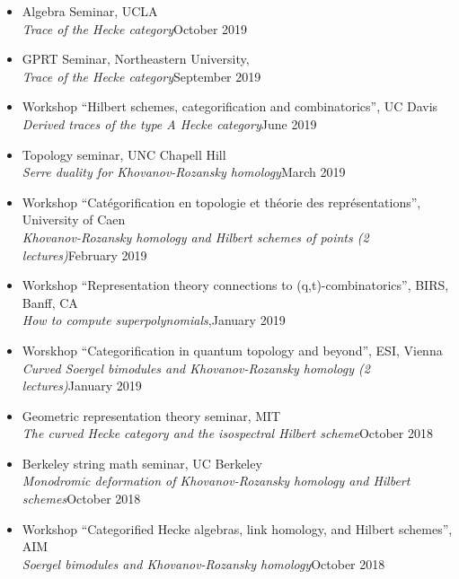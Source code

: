 \documentclass[12pt]{amsart}
\renewcommand{\j}{\indent}
\begin{document}
\begin{itemize}
\item[$\cdot$]Algebra Seminar, UCLA\\
\j \emph{Trace of the Hecke category}\hfill October 2019

\item[$\cdot$]GPRT Seminar, Northeastern University,\\
\j \emph{Trace of the Hecke category}\hfill September 2019


\item[$\cdot$]Workshop ``Hilbert schemes, categorification and combinatorics'', UC Davis\\
\j \emph{Derived traces of the type A Hecke category}\hfill June 2019


\item[$\cdot$]Topology seminar, UNC Chapell Hill\\
\j \emph{Serre duality for Khovanov-Rozansky homology}\hfill March 2019

\item[$\cdot$]Workshop ``Cat\'{e}gorification en topologie et th\'{e}orie des repr\'{e}sentations'', University of Caen\\
\j \emph{Khovanov-Rozansky homology and Hilbert schemes of points (2 lectures)}\hfill February 2019


\item[$\cdot$]Workshop ``Representation theory connections to (q,t)-combinatorics'', BIRS, Banff, CA\\
\j\emph{How to compute superpolynomials},\hfill January 2019


\item[$\cdot$]Worskhop ``Categorification in quantum topology and beyond'', ESI, Vienna\\
\j \emph{Curved Soergel bimodules and Khovanov-Rozansky homology (2 lectures)}\hfill January 2019 


\item[$\cdot$]Geometric representation theory seminar, MIT\\
\j \emph{The curved Hecke category and the isospectral Hilbert scheme}\hfill October 2018

\item[$\cdot$]Berkeley string math seminar, UC Berkeley\\
\j \emph{Monodromic deformation of Khovanov-Rozansky homology and Hilbert schemes}\hfill October 2018


\item[$\cdot$]Workshop ``Categorified Hecke algebras, link homology, and Hilbert schemes'', AIM\\
\j\emph{Soergel bimodules and Khovanov-Rozansky homology}\hfill October 2018


\end{itemize}
\end{document}
